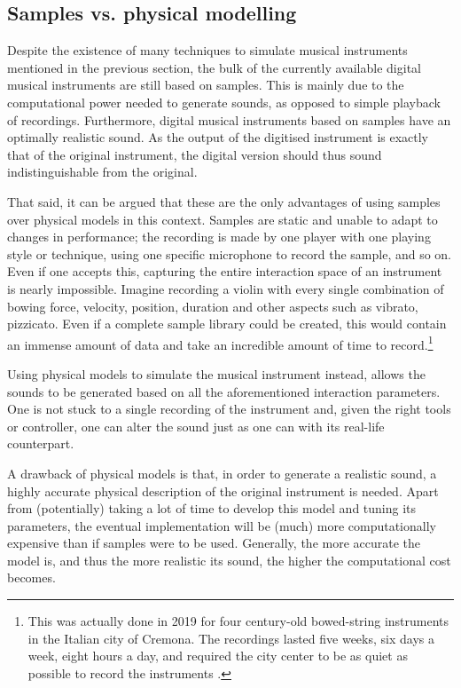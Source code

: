 \subsection{Samples vs. physical modelling}
Despite the existence of many techniques to simulate musical instruments mentioned in the previous section, the bulk of the currently available digital musical instruments are still based on samples. This is mainly due to the computational power needed to generate sounds, as opposed to simple playback of recordings. Furthermore, digital musical instruments based on samples have an optimally realistic sound. As the output of the digitised instrument is exactly that of the original instrument, the digital version should thus sound indistinguishable from the original.

That said, it can be argued that these are the only advantages of using samples over physical models in this context. Samples are static and unable to adapt to changes in performance; the recording is made by one player with one playing style or technique, using one specific microphone to record the sample, and so on. Even if one accepts this, capturing the entire interaction space of an instrument is nearly impossible. Imagine recording a violin with every single combination of bowing force, velocity, position, duration and other aspects such as vibrato, pizzicato. Even if a complete sample library could be created, this would contain an immense amount of data and take an incredible amount of time to record.\footnote{This was actually done in 2019 for four century-old bowed-string instruments in the Italian city of Cremona. The recordings lasted five weeks, six days a week, eight hours a day, and required the city center to be as quiet as possible to record the instruments \cite{nytimes, npr}.} 

Using physical models to simulate the musical instrument instead, allows the sounds to be generated based on all the aforementioned interaction parameters. One is not stuck to a single recording of the instrument and, given the right tools or controller, one can alter the sound just as one can with its real-life counterpart.

A drawback of physical models is that, in order to generate a realistic sound, a highly accurate physical description of the original instrument is needed. Apart from (potentially) taking a lot of time to develop this model and tuning its parameters, the eventual implementation will be (much) more computationally expensive than if samples were to be used. Generally, the more accurate the model is, and thus the more realistic its sound, the higher the computational cost becomes. 

